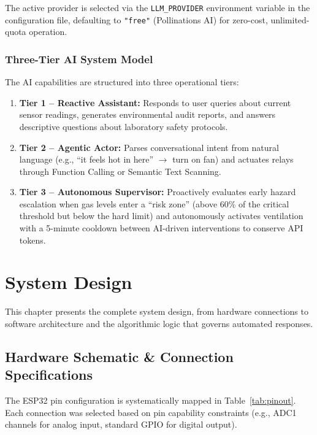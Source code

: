 \documentclass[12pt,a4paper]{report}
\begin{document}
The active provider is selected via the \texttt{LLM\_PROVIDER} environment variable in the configuration file, defaulting to \texttt{"free"} (Pollinations AI) for zero-cost, unlimited-quota operation.

\subsection{Three-Tier AI System Model}
The AI capabilities are structured into three operational tiers:
\begin{enumerate}[leftmargin=2cm]
    \item \textbf{Tier 1 -- Reactive Assistant:} Responds to user queries about current sensor readings, generates environmental audit reports, and answers descriptive questions about laboratory safety protocols.
    \item \textbf{Tier 2 -- Agentic Actor:} Parses conversational intent from natural language (e.g., ``it feels hot in here'' $\rightarrow$ turn on fan) and actuates relays through Function Calling or Semantic Text Scanning.
    \item \textbf{Tier 3 -- Autonomous Supervisor:} Proactively evaluates early hazard escalation when gas levels enter a ``risk zone'' (above 60\% of the critical threshold but below the hard limit) and autonomously activates ventilation with a 5-minute cooldown between AI-driven interventions to conserve API tokens.
\end{enumerate}


\chapter{System Design}
\label{ch:design}

This chapter presents the complete system design, from hardware connections to software architecture and the algorithmic logic that governs automated responses.

\section{Hardware Schematic \& Connection Specifications}
The ESP32 pin configuration is systematically mapped in Table~\ref{tab:pinout}. Each connection was selected based on pin capability constraints (e.g., ADC1 channels for analog input, standard GPIO for digital output).
\end{document}

